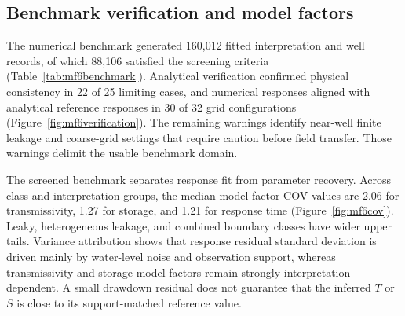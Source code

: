 \documentclass[a4paper,fleqn]{cas-sc}
\begin{document}
\subsection{Benchmark verification and model factors}

The numerical benchmark generated 160,012 fitted interpretation and well records, of which 88,106 satisfied the screening criteria (Table~\ref{tab:mf6benchmark}). Analytical verification confirmed physical consistency in 22 of 25 limiting cases, and numerical responses aligned with analytical reference responses in 30 of 32 grid configurations (Figure~\ref{fig:mf6verification}). The remaining warnings identify near-well finite leakage and coarse-grid settings that require caution before field transfer. Those warnings delimit the usable benchmark domain.

The screened benchmark separates response fit from parameter recovery. Across class and interpretation groups, the median model-factor COV values are 2.06 for transmissivity, 1.27 for storage, and 1.21 for response time (Figure~\ref{fig:mf6cov}). Leaky, heterogeneous leakage, and combined boundary classes have wider upper tails. Variance attribution shows that response residual standard deviation is driven mainly by water-level noise and observation support, whereas transmissivity and storage model factors remain strongly interpretation dependent. A small drawdown residual does not guarantee that the inferred $T$ or $S$ is close to its support-matched reference value.
\end{document}
